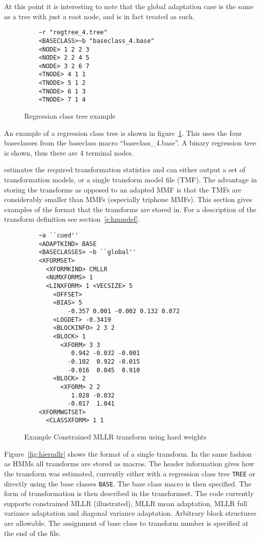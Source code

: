 At this point it is interesting to note that the global adaptation
case is the same as a tree with just a root node, and is in fact
treated as such.

\begin{center}
\begin{figure}
\begin{verbatim}
    ~r "regtree_4.tree"
    <BASECLASS>~b "baseclass_4.base"
    <NODE> 1 2 2 3 
    <NODE> 2 2 4 5 
    <NODE> 3 2 6 7 
    <TNODE> 4 1 1
    <TNODE> 5 1 2
    <TNODE> 6 1 3
    <TNODE> 7 1 4
\end{verbatim}
\caption{Regression class tree example}
\label{fig:regtree}
\end{figure}
\end{center}
An example of a regression class tree is shown in figure~\ref{fig:regtree}.
This uses the four baseclasses from the baseclass macro ``baseclass\_4.base''.
A binary regression tree is shown, thus there are 4 terminal nodes. 


 estimates the required transformation statistics and can
either output a set of transformation models, or a single transform
model file (TMF). The advantage
in storing the transforms as opposed to an adapted MMF is that the
TMFs are considerably smaller than MMFs (especially triphone
MMFs). This section gives examples of the format that the transforms
are stored in. For a description of the transform definition see
section~\ref{s:hmmdef}.

\noindent

\begin{figure}[htbp]
\begin{verbatim}
    ~a ``cued''
    <ADAPTKIND> BASE
    <BASECLASSES> ~b ``global''
    <XFORMSET>  
      <XFORMKIND> CMLLR
      <NUMXFORMS> 1
      <LINXFORM> 1 <VECSIZE> 5
        <OFFSET> 
        <BIAS> 5
            -0.357 0.001 -0.002 0.132 0.072
        <LOGDET> -0.3419
        <BLOCKINFO> 2 3 2
        <BLOCK> 1
          <XFORM> 3 3
             0.942 -0.032 -0.001
            -0.102  0.922 -0.015
            -0.016  0.045  0.910
        <BLOCK> 2
          <XFORM> 2 2
             1.028 -0.032
            -0.017  1.041 
    <XFORMWGTSET>
      <CLASSXFORM> 1 1
\end{verbatim}
\caption{Example Constrained MLLR transform using hard weights}
\end{figure}
Figure~\ref{fig:hiermllr} shows the format of a single transform. In
the same fashion as HMMs all transforms are stored as macros. The
header information gives how the transform was estimated, currently
either with a regression class tree {\tt TREE} or directly using the
base classes {\tt BASE}. The base class macro is then specified. The
form of transformation is then described in the transformset. The code
currently supports constrained MLLR (illustrated), MLLR mean
adaptation, MLLR full variance adaptation and diagonal variance
adaptation.  Arbitrary block structures are allowable.  The assignment
of base class to transform number is specified at the end of the file.

